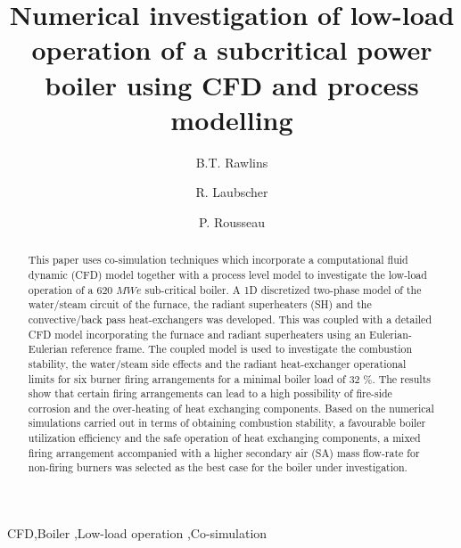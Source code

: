 \documentclass[review]{elsarticle}
\begin{document}
\begin{frontmatter}

\title{Numerical investigation of low-load operation of a subcritical power boiler using CFD and process modelling}

\author{B.T. Rawlins}
\author{R. Laubscher}
\author{P. Rousseau}
\address{Department of Mechanical Engineering, Applied Thermal-Fluid Process Modeling Research Unit, University of Cape Town, Library Rd, Rondebosch, Cape Town, 7701, South Africa}
\address{$^*$ Department of Mechanical Engineering, Stellenbosch University, Stellenbosch Central, Stellenbosch, 7599, South-Africa}

\begin{abstract}
This paper uses co-simulation techniques which incorporate a computational fluid dynamic (CFD) model together with a process level model to investigate the low-load operation of a 620 $MWe$ sub-critical boiler. A 1D discretized two-phase model of the water/steam circuit of the furnace, the radiant superheaters (SH) and the convective/back pass heat-exchangers was developed. This was coupled with a detailed CFD model incorporating the furnace and radiant superheaters using an Eulerian-Eulerian reference frame. The coupled model is used to investigate the combustion stability, the water/steam side effects and the radiant heat-exchanger operational limits for six burner firing arrangements for a minimal boiler load of 32 \%. The results show that certain firing arrangements can lead to a high possibility of fire-side corrosion and the over-heating of heat exchanging components. Based on the numerical simulations carried out in terms of obtaining combustion stability, a favourable boiler utilization efficiency and the safe operation of heat exchanging components, a mixed firing arrangement accompanied with a higher secondary air (SA) mass flow-rate for non-firing burners was selected as the best case for the boiler under investigation.
\end{abstract}

\begin{keyword}
CFD\sep Boiler \sep Low-load operation \sep Co-simulation
\end{keyword}
\newpage
\end{frontmatter}

\printnomenclature
\end{document}
